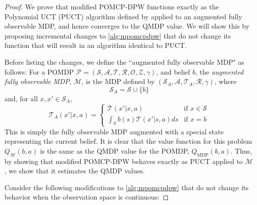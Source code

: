 \begin{proof}
    We prove that modified POMCP-DPW functions exactly as the Polynomial UCT (PUCT) algorithm defined by \citet{auger2013continuous} applied to an augmented fully observable MDP, and hence converges to the QMDP value.
    We will show this by proposing incremental changes to \cref{alg:mpomcpdpw} that do not change its function that will result in an algorithm identical to PUCT.

    Before listing the changes, we define the ``augmented fully observable MDP" as follows: For a POMDP $\mathcal{P} = (\mathcal{S}, \mathcal{A}, \mathcal{T}, \mathcal{R}, \mathcal{O}, \mathcal{Z}, \gamma)$, and belief $b$, the \emph{augmented fully observable MDP}, $\mathcal{M}$, is the MDP defined by $(\mathcal{S}_A, \mathcal{A}, \mathcal{T}_A, \mathcal{R}, \gamma)$, where 
    \begin{equation}
        \mathcal{S}_A = \mathcal{S} \cup \{b\}
    \end{equation}
    and, for all $x, x' \in \mathcal{S}_A$,
    \begin{equation}
        \mathcal{T}_A (x'|x, a) = \begin{cases}
                \mathcal{T} (x' | x, a) & \text{if } x \in \mathcal{S} \\
                \int_S b(s) \mathcal{T} (x' | s, a) ds & \text{if } x = b
        \end{cases}
    \end{equation}
    This is simply the fully observable MDP augmented with a special state representing the current belief.
    It is clear that the value function for this problem $Q_\mathcal{M}(b, a)$ is the same as the QMDP value for the POMDP, $Q_\text{MDP}(b,a)$.
    Thus, by showing that modified POMCP-DPW behaves exactly as PUCT applied to $\mathcal{M}$, we show that it estimates the QMDP values.


    Consider the following modifications to \cref{alg:mpomcpdpw} that do not change its behavior when the observation space is continuous:


\end{proof}
